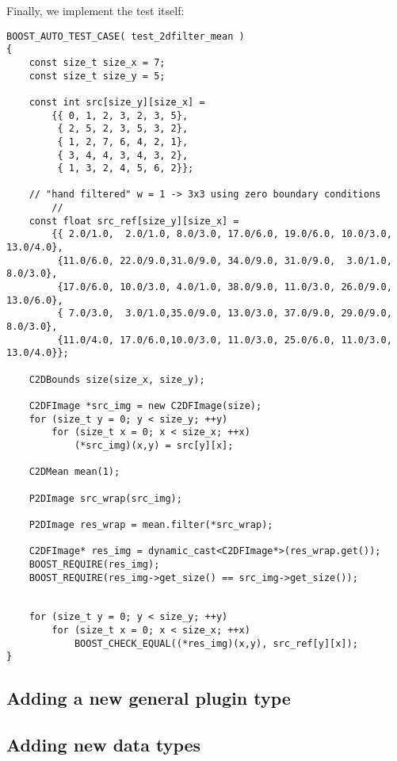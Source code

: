 \documentclass[english, 10pt, a4paper,headsepline,openany]{scrbook}
\begin{document}
Finally, we implement the test itself: 
\begin{lstlisting}[MeanFilterExample]
BOOST_AUTO_TEST_CASE( test_2dfilter_mean )
{
	const size_t size_x = 7;
	const size_t size_y = 5;

	const int src[size_y][size_x] =
		{{ 0, 1, 2, 3, 2, 3, 5},
		 { 2, 5, 2, 3, 5, 3, 2},
		 { 1, 2, 7, 6, 4, 2, 1},
		 { 3, 4, 4, 3, 4, 3, 2},
		 { 1, 3, 2, 4, 5, 6, 2}};

	// "hand filtered" w = 1 -> 3x3 using zero boundary conditions 
        //
	const float src_ref[size_y][size_x] =
        {{ 2.0/1.0,  2.0/1.0, 8.0/3.0, 17.0/6.0, 19.0/6.0, 10.0/3.0, 13.0/4.0},
         {11.0/6.0, 22.0/9.0,31.0/9.0, 34.0/9.0, 31.0/9.0,  3.0/1.0,  8.0/3.0},
         {17.0/6.0, 10.0/3.0, 4.0/1.0, 38.0/9.0, 11.0/3.0, 26.0/9.0, 13.0/6.0},
         { 7.0/3.0,  3.0/1.0,35.0/9.0, 13.0/3.0, 37.0/9.0, 29.0/9.0,  8.0/3.0},
         {11.0/4.0, 17.0/6.0,10.0/3.0, 11.0/3.0, 25.0/6.0, 11.0/3.0, 13.0/4.0}}; 

	C2DBounds size(size_x, size_y);

	C2DFImage *src_img = new C2DFImage(size);
	for (size_t y = 0; y < size_y; ++y)
		for (size_t x = 0; x < size_x; ++x)
			(*src_img)(x,y) = src[y][x];

	C2DMean mean(1);

	P2DImage src_wrap(src_img);

	P2DImage res_wrap = mean.filter(*src_wrap);

	C2DFImage* res_img = dynamic_cast<C2DFImage*>(res_wrap.get());
	BOOST_REQUIRE(res_img);
	BOOST_REQUIRE(res_img->get_size() == src_img->get_size());


	for (size_t y = 0; y < size_y; ++y)
		for (size_t x = 0; x < size_x; ++x)
			BOOST_CHECK_EQUAL((*res_img)(x,y), src_ref[y][x]);
}
\end{lstlisting}







\subsection{Adding a new general plugin type}
\label{ch:addpluginstype}

\subsection{Adding new data types}
\label{sec:adddatatypeio}



\cleardoublepage{}

\end{document}
